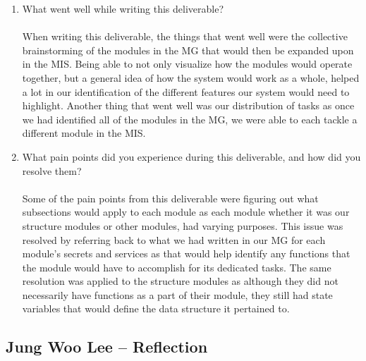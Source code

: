 \documentclass[12pt, titlepage]{article}
\begin{document}
\begin{enumerate}
  \item What went well while writing this deliverable?\\\\
  When writing this deliverable, the things that went well were the collective brainstorming
  of the modules in the MG that would then be expanded upon in the MIS. Being able to not only
  visualize how the modules would operate together, but a general idea of how the system would
  work as a whole, helped a lot in our identification of the different features our system would
  need to highlight. Another thing that went well was our distribution of tasks as once we had
  identified all of the modules in the MG, we were able to each tackle a different module in the
  MIS.
  \item What pain points did you experience during this deliverable, and how
  did you resolve them?\\\\
  Some of the pain points from this deliverable were figuring out what subsections would apply to
  each module as each module whether it was our structure modules or other modules, had varying
  purposes. This issue was resolved by referring back to what we had written in our MG for each
  module's secrets and services as that would help identify any functions that the module would
  have to accomplish for its dedicated tasks. The same resolution was applied to the structure
  modules as although they did not necessarily have functions as a part of their module, they still
  had state variables that would define the data structure it pertained to.
\end{enumerate}

\subsection*{Jung Woo Lee -- Reflection}
\end{document}
